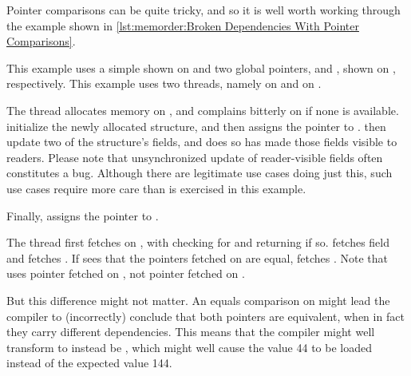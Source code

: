 Pointer comparisons can be quite tricky, and so it is well worth working
through the example shown in
\cref{lst:memorder:Broken Dependencies With Pointer Comparisons}.
\begin{fcvref}
This example uses a simple  shown on 
and two global pointers,  and , shown on ,
respectively.
This example uses two threads, namely  on
 and  on .
\end{fcvref}

\begin{fcvref}
The  thread allocates memory on , and complains
bitterly on  if none is available.
 initialize the newly allocated structure,
and then  assigns the pointer to .
 then update two of the structure's fields, and does
so   has made those fields visible to readers.
Please note that unsynchronized update of reader-visible fields
often constitutes a bug.
Although there are legitimate use cases doing just this, such use cases
require more care than is exercised in this example.

Finally,  assigns the pointer to .
\end{fcvref}

\begin{fcvref}
The  thread first fetches  on , with
 checking for  and returning if so.
 fetches field  and
 fetches .
If  sees that the pointers fetched on 
are equal,  fetches .
Note that  uses pointer  fetched on , not
pointer  fetched on .

But this difference might not matter.
An equals comparison on  might lead the compiler to (incorrectly)
conclude that both pointers are equivalent, when in fact they carry
different dependencies.
This means that the compiler might well transform  to instead
be , which might well cause the value 44 to be loaded
instead of the expected value 144.
\end{fcvref}


